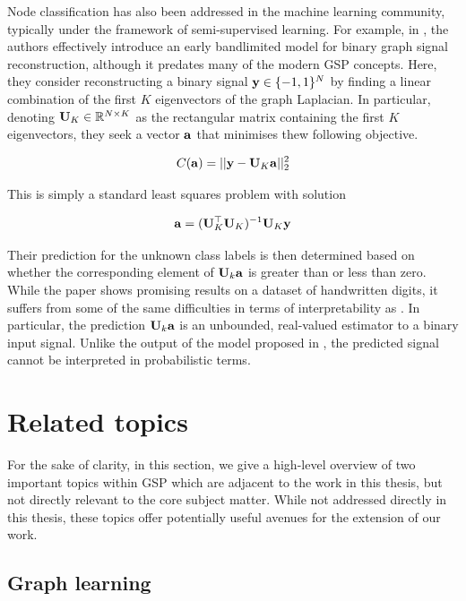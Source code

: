 Node classification has also been addressed in the machine learning community, typically under the framework of semi-supervised learning. For example, in \cite{Belkin2002}, the authors effectively introduce an early bandlimited model for binary graph signal reconstruction, although it predates many of the modern GSP concepts. Here, they consider reconstructing a binary signal $\mathbf{y} \in \{-1, 1\}^{N}$ by finding a linear combination of the first $K$ eigenvectors of the graph Laplacian. In particular, denoting $\mathbf{U}_K \in \mathbb{R}^{N \times K}$ as the rectangular matrix containing the first $K$ eigenvectors, they seek a vector $\mathbf{a}$ that minimises thew following objective.

\begin{equation}
    C(\mathbf{a}) = || \mathbf{y} - \mathbf{U}_K \mathbf{a} ||^2_2
\end{equation}

This is simply a standard least squares problem with solution 

\begin{equation}
    \mathbf{a} = (\mathbf{U}_K^\top \mathbf{U}_K)^{-1} \mathbf{U}_K \mathbf{y}
\end{equation}

Their prediction for the unknown class labels is then determined based on whether the corresponding element of $\mathbf{U}_k \mathbf{a}$ is greater than or less than zero. While the paper shows promising results on a dataset of handwritten digits, it suffers from some of the same difficulties in terms of interpretability as \cite{Sandryhaila2013a}. In particular, the prediction $\mathbf{U}_k \mathbf{a}$ is an unbounded, real-valued estimator to a binary input signal. Unlike the output of the model proposed in \cite{Tran2020}, the predicted signal cannot be interpreted in probabilistic terms. 


\section{Related topics}

For the sake of clarity, in this section, we give a high-level overview of two important topics within GSP which are adjacent to the work in this thesis, but not directly relevant to the core subject matter. While not addressed directly in this thesis, these topics offer potentially useful avenues for the extension of our work. 


\subsection{Graph learning}

